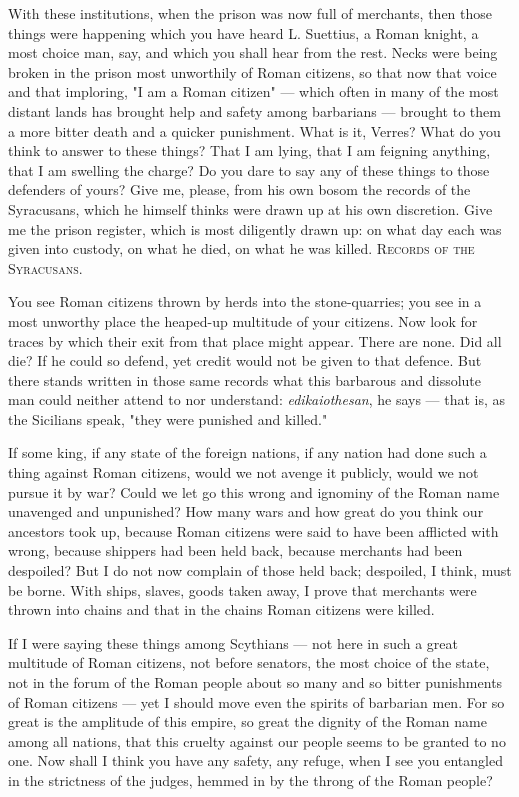  With these institutions, when the prison was now full of merchants, then those things were happening which you have heard L. Suettius, a Roman knight, a most choice man, say, and which you shall hear from the rest. Necks were being broken in the prison most unworthily of Roman citizens, so that now that voice and that imploring, "I am a Roman citizen" --- which often in many of the most distant lands has brought help and safety among barbarians --- brought to them a more bitter death and a quicker punishment. What is it, Verres? What do you think to answer to these things? That I am lying, that I am feigning anything, that I am swelling the charge? Do you dare to say any of these things to those defenders of yours? Give me, please, from his own bosom the records of the Syracusans, which he himself thinks were drawn up at his own discretion. Give me the prison register, which is most diligently drawn up: on what day each was given into custody, on what he died, on what he was killed. \textsc{Records of the Syracusans}.

 You see Roman citizens thrown by herds into the stone-quarries; you see in a most unworthy place the heaped-up multitude of your citizens. Now look for traces by which their exit from that place might appear. There are none. Did all die? If he could so defend, yet credit would not be given to that defence. But there stands written in those same records what this barbarous and dissolute man could neither attend to nor understand: \textit{edikaiothesan}, he says --- that is, as the Sicilians speak, "they were punished and killed."

 If some king, if any state of the foreign nations, if any nation had done such a thing against Roman citizens, would we not avenge it publicly, would we not pursue it by war? Could we let go this wrong and ignominy of the Roman name unavenged and unpunished? How many wars and how great do you think our ancestors took up, because Roman citizens were said to have been afflicted with wrong, because shippers had been held back, because merchants had been despoiled? But I do not now complain of those held back; despoiled, I think, must be borne. With ships, slaves, goods taken away, I prove that merchants were thrown into chains and that in the chains Roman citizens were killed.

 If I were saying these things among Scythians --- not here in such a great multitude of Roman citizens, not before senators, the most choice of the state, not in the forum of the Roman people about so many and so bitter punishments of Roman citizens --- yet I should move even the spirits of barbarian men. For so great is the amplitude of this empire, so great the dignity of the Roman name among all nations, that this cruelty against our people seems to be granted to no one. Now shall I think you have any safety, any refuge, when I see you entangled in the strictness of the judges, hemmed in by the throng of the Roman people?

